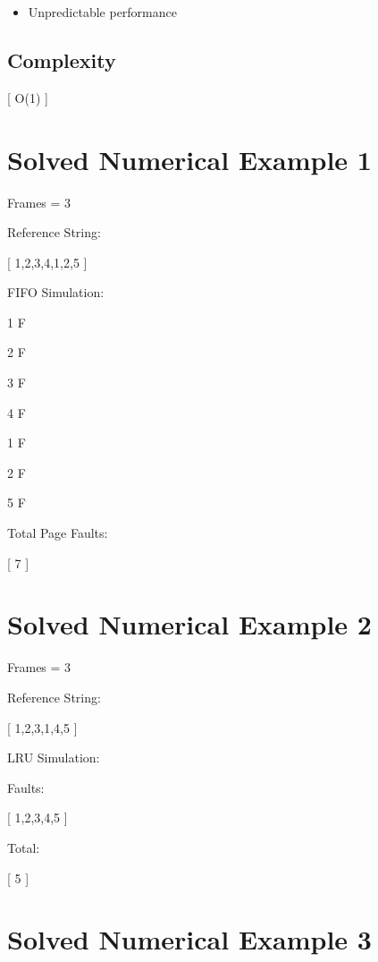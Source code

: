 \begin{itemize}
\item Unpredictable performance
\end{itemize}

\subsection{Complexity}

[
O(1)
]

\section{Solved Numerical Example 1}

Frames = 3

Reference String:

[
1,2,3,4,1,2,5
]

FIFO Simulation:

\begin{center}
1 F

2 F

3 F

4 F

1 F

2 F

5 F
\end{center}

Total Page Faults:

[
7
]

\section{Solved Numerical Example 2}

Frames = 3

Reference String:

[
1,2,3,1,4,5
]

LRU Simulation:

Faults:

[
1,2,3,4,5
]

Total:

[
5
]

\section{Solved Numerical Example 3}

